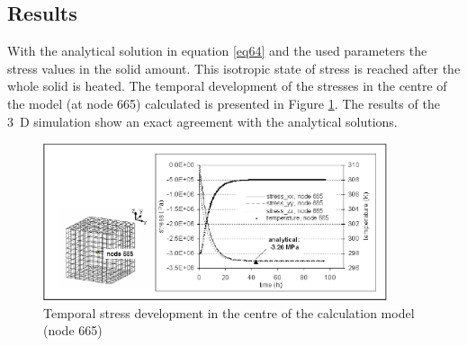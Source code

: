 \subsection{Results}
With the analytical solution in equation \eqref{eq64} and the used parameters the stress values in the solid amount. This isotropic state of stress is reached after the whole solid is heated. The temporal development of the stresses in the centre of the model (at node 665) calculated is presented in Figure \ref{fig63}. The results of the 3~D simulation show an exact agreement with the analytical solutions.

\begin{figure}[htbp]
\centering
\includegraphics[width=0.9\textwidth]{PART_III/TM/figures/fig63}
\caption{Temporal stress development in the centre of the calculation model (node 665)}
\label{fig63}
\end{figure}

